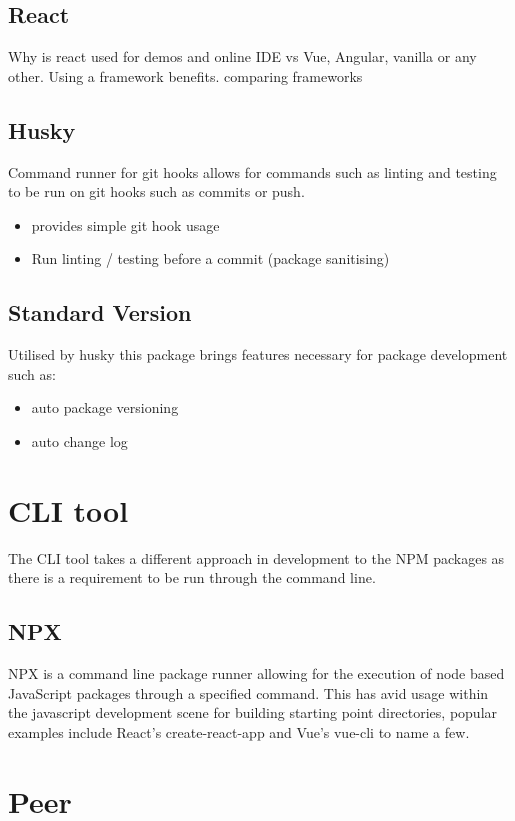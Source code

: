 \documentclass{l4proj}
\begin{document}
\subsection{React }
\text Why is react used for demos and online IDE vs Vue, Angular, vanilla or any other. Using a framework benefits.
comparing frameworks

\subsection{Husky }
Command runner for git hooks allows for commands such as linting and testing to be run on git hooks such as commits or push.
\begin{itemize}
    \item provides simple git hook usage
    \item Run linting / testing before a commit (package sanitising)
\end{itemize}
\subsection{Standard Version}
Utilised by husky this package brings features necessary for package development such as:
\begin{itemize}
    \item auto package versioning
    \item auto change log
\end{itemize}

\section{CLI tool }

The CLI tool takes a different approach in development to the NPM packages as there is a requirement to be run through the command line.

\subsection{NPX }
\text NPX is a command line package runner allowing for the execution of node based JavaScript packages through a specified command. This has avid usage within the javascript development scene for building starting point directories, popular examples include React's create-react-app and Vue's vue-cli to name a few.

\section{Peer }
\end{document}
